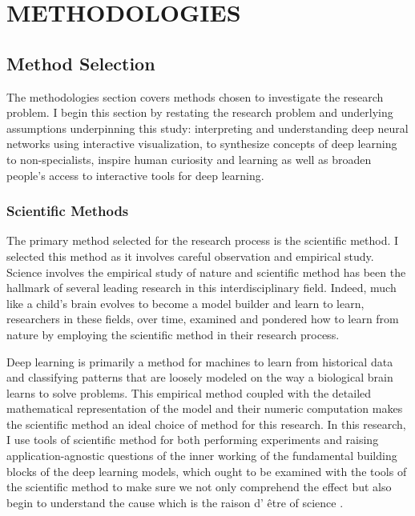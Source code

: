 \chapter{METHODOLOGIES}

\graphicspath{ {./methodologies/} }
\thispagestyle{empty}


\section{Method Selection}

The methodologies section covers methods chosen to investigate the research problem. I begin this section by restating the research problem and underlying assumptions underpinning this study: interpreting and understanding deep neural networks using interactive visualization, to 
synthesize concepts of deep learning to non-specialists, inspire human curiosity and learning as well as broaden people’s access to interactive tools for deep learning.

\subsection{Scientific Methods}

The primary method selected for the research process is the scientific method. I selected this method as it involves careful observation and empirical study. Science involves the empirical study of nature and scientific method has been the hallmark of several leading research in this interdisciplinary field. Indeed, much like a child’s brain evolves to become a model builder and learn to learn, researchers in these fields, over time, examined and pondered how to learn from nature by employing the scientific method in their research process. 

Deep learning is primarily a method for machines to learn from historical data and classifying patterns that are loosely modeled on the way a biological brain learns to solve problems. This empirical method coupled with the detailed mathematical representation of the model and their numeric computation makes the scientific method an ideal choice of method for this research. In this research, I use tools of scientific method for both performing experiments and raising application-agnostic questions of the inner working of the fundamental building blocks of the deep learning models, which ought to be examined with the tools of the scientific method to make sure we not only comprehend the effect but also begin to understand the cause which is the raison d’ \^{e}tre of science \cite{edsarx.1904.1092220190101}.

